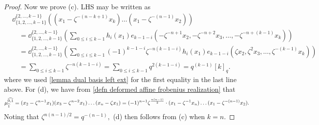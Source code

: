 \begin{proof}
   Now we prove (c).
   LHS may be written as
    \begin{align*}
    &\dd_{\{1,2, \ldots ,k-1\}}^{\{2, \ldots ,k-1\}}\left((x_1-\zeta^{-(n-k+1)}x_k)\ldots (x_1-\zeta^{-(n-1)}x_2)\right) \\
    &\quad= \dd_{\{1,2, \ldots ,k-1\}}^{\{2, \ldots ,k-1\}}\left(\sum_{0 \leq i \leq k-1}h_i(x_1)e_{k-1-i}(-\zeta^{-n+1}x_2, -\zeta^{-n+2} x_3, \ldots, -\zeta^{-n+(k-1)}x_k)\right)\\
    &\quad=\dd_{\{1,2, \ldots ,k-1\}}^{\{2, \ldots ,k-1\}}\left(\sum_{0 \leq i \leq k-1}(-1)^{k-1-i}\zeta^{-n(k-1-i)}h_i(x_1)e_{k-1-i}(\zeta x_2, \zeta^{2} x_3, \ldots, \zeta^{-(k-1)}x_k)\right)\\
    &\quad = \sum_{0 \leq i \leq k-1} \zeta^{-n(k-1-i)} = \sum_{0 \leq i \leq k-1}q^{2(k-1-i)}=q^{(k-1)}[k]_q.
    \end{align*}
    where we used \cref{lemma dual basis left ext} for the first equality in the last line above.
    For (d), we have from \cref{defn deformed affine frobenius realization} that
    $$\mu^{\widehat{0,1}}_{\widehat{1}}= (x_2-\zeta^{n-1}x_1)(x_3-\zeta^{n-2}x_1)\ldots (x_n-\zeta x_1)=(-1)^{n-1}\zeta^{\frac{n(n-1)}{2}}\cdot(x_1-\zeta^{-1}x_{n})\ldots (x_1-\zeta^{-(n-1)}x_2).$$
    Noting that $\zeta^{n(n-1)/2}= q^{-(n-1)},$ (d) then follows from (c) when $k=n.$  
\end{proof}






